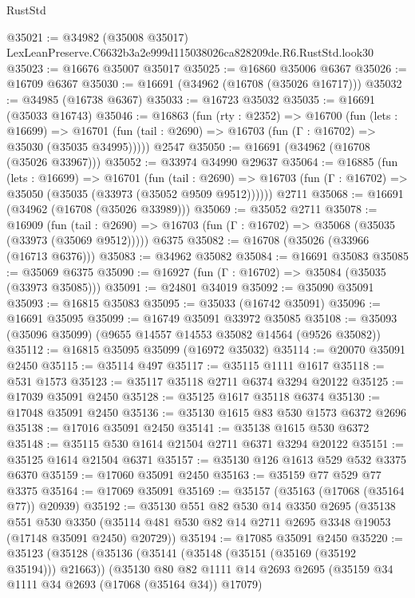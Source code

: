 \begin{lexlean}{RustStd}
\begin{coremodule}
@35021 := @34982 (@35008 @35017) LexLeanPreserve.C6632b3a2e999d115038026ca828209de.R6.RustStd.look30
@35023 := @16676 @35007 @35017
@35025 := @16860 @35006 @6367
@35026 := @16709 @6367
@35030 := @16691 (@34962 (@16708 (@35026 @16717)))
@35032 := @34985 (@16738 @6367)
@35033 := @16723 @35032
@35035 := @16691 (@35033 @16743)
@35046 := @16863
    (fun (rty : @2352) =>
    @16700
      (fun (lets : @16699) =>
      @16701 (fun (tail : @2690) => @16703 (fun (Γ : @16702) => @35030 (@35035 @34995)))))
    @2547
@35050 := @16691 (@34962 (@16708 (@35026 @33967)))
@35052 := @33974 @34990 @29637
@35064 := @16885
    (fun (lets : @16699) =>
    @16701
      (fun (tail : @2690) =>
      @16703 (fun (Γ : @16702) => @35050 (@35035 (@33973 (@35052 @9509 @9512))))))
    @2711
@35068 := @16691 (@34962 (@16708 (@35026 @33989)))
@35069 := @35052 @2711
@35078 := @16909
    (fun (tail : @2690) => @16703 (fun (Γ : @16702) => @35068 (@35035 (@33973 (@35069 @9512)))))
    @6375
@35082 := @16708 (@35026 (@33966 (@16713 @6376)))
@35083 := @34962 @35082
@35084 := @16691 @35083
@35085 := @35069 @6375
@35090 := @16927 (fun (Γ : @16702) => @35084 (@35035 (@33973 @35085)))
@35091 := @24801 @34019
@35092 := @35090 @35091
@35093 := @16815 @35083
@35095 := @35033 (@16742 @35091)
@35096 := @16691 @35095
@35099 := @16749 @35091 @33972 @35085
@35108 := @35093 (@35096 @35099) (@9655 @14557 @14553 @35082 @14564 (@9526 @35082))
@35112 := @16815 @35095 @35099 (@16972 @35032)
@35114 := @20070 @35091 @2450
@35115 := @35114 @497
@35117 := @35115 @1111 @1617
@35118 := @531 @1573
@35123 := @35117 @35118 @2711 @6374 @3294 @20122
@35125 := @17039 @35091 @2450
@35128 := @35125 @1617 @35118 @6374
@35130 := @17048 @35091 @2450
@35136 := @35130 @1615 @83 @530 @1573 @6372 @2696
@35138 := @17016 @35091 @2450
@35141 := @35138 @1615 @530 @6372
@35148 := @35115 @530 @1614 @21504 @2711 @6371 @3294 @20122
@35151 := @35125 @1614 @21504 @6371
@35157 := @35130 @126 @1613 @529 @532 @3375 @6370
@35159 := @17060 @35091 @2450
@35163 := @35159 @77 @529 @77 @3375
@35164 := @17069 @35091
@35169 := @35157 (@35163 (@17068 (@35164 @77)) @20939)
@35192 := @35130
    @551
    @82
    @530
    @14
    @3350
    @2695
    (@35138
      @551
      @530
      @3350
      (@35114 @481 @530 @82 @14 @2711 @2695 @3348 @19053 (@17148 @35091 @2450) @20729))
@35194 := @17085 @35091 @2450
@35220 := @35123
    (@35128
      (@35136
        (@35141 (@35148 (@35151 (@35169 (@35192 @35194))) @21663))
        (@35130
          @80
          @82
          @1111
          @14
          @2693
          @2695
          (@35159 @34 @1111 @34 @2693 (@17068 (@35164 @34)) @17079)

\end{coremodule}
\end{lexlean}
